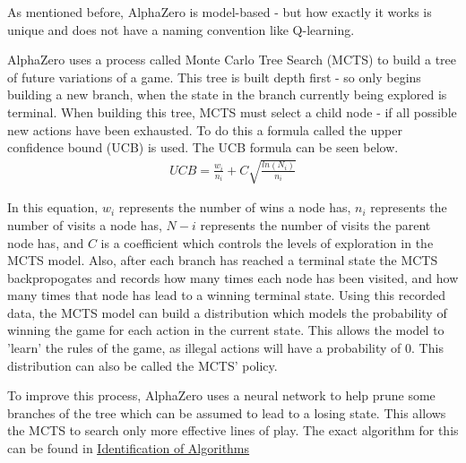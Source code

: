 \documentclass{article}
\makeatletter
\newcommand\subsubsubsection{\@startsection{paragraph}{4}{\z@}{-2.5ex\@plus -1ex \@minus -.25ex}{1.25ex \@plus .25ex}{\normalfont\normalsize\bfseries}}
\newcommand{\myhy}[2]{\hyperref[#1]{\color{black}\setulcolor{black}\ul{#2}}}
\makeatother
\begin{document}
    \subsubsubsection{AlphaZero}
    As mentioned before, AlphaZero is model-based - but how exactly it works is unique and does not have a naming convention like Q-learning.

    AlphaZero uses a process called Monte Carlo Tree Search (MCTS) to build a tree of future variations of a game. This tree is built depth first - so only begins building a new branch, when the state in the
    branch currently being explored is terminal. When building this tree, MCTS must select a child node - if all possible new actions have been exhausted. To do this a formula called the upper confidence 
    bound (UCB) is used. The UCB formula can be seen below.
    \begin{align}
        UCB = \frac{w_i}{n_i} + C\sqrt{\frac{ln(N_i)}{n_i}}
    \end{align}
    
    In this equation, $w_i$ represents the number of wins a node has, $n_i$ represents the number of visits a node has, $N-i$ represents the number of visits the parent node has, and $C$ is a coefficient which
    controls the levels of exploration in the MCTS model.
    Also, after each branch has reached a terminal state the MCTS backpropogates and records how many times each node has been visited, and how many times that node has lead to a winning terminal state. 
    Using this recorded data, the MCTS model can build a distribution which models the probability of winning the game for each action in the current state. This allows the model to 'learn' the rules
    of the game, as illegal actions will have a probability of 0. This distribution can also be called the MCTS' policy.

    To improve this process, AlphaZero uses a neural network to help prune some branches of the tree which can be assumed to lead to a losing state. This allows the MCTS to search only more effective
    lines of play. The exact algorithm for this can be found in \myhy{sec:IDoA}{Identification of Algorithms}
    


    
\end{document}
